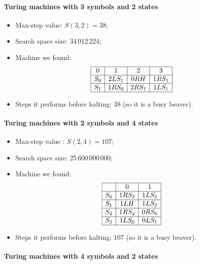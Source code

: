 \documentclass{report}
\begin{document}
\paragraph{Turing machines with 3 symbols and 2 states}

\begin{itemize}
\item Max-step value: $S(3,2) = 38$;
\item Search space size: 34\,012\,224;
\item Machine we found:
\[
\begin{array}[h]{|c|c|c|c|c|}
\hline
0&   1&   2& 3\\
\hline
S_0& 2LS_1& 0RH& 1RS_1\\
\hline
S_1& 1RS_0& 2RS_1& 1LS_1\\
\hline
\end{array}
\]
\item Steps it performs before halting: 38 (so it is a busy beaver).
\end{itemize}


\paragraph{Turing machines with 2 symbols and 4 states}


\begin{itemize}
\item Max-step value \cite{allen}: $S(2,4) = 107$;
\item Search space size: 25\,600\,000\,000;
\item Machine we found:
\[
\begin{array}[h]{|c|c|c|c|}
  \hline
  &0&   1\\
  \hline
  S_0& 1RS_3& 1LS_3\\
  \hline
  S_1& 1LH& 1LS_2\\
  \hline
  S_2& 1RS_2& 0RS_0\\
  \hline
  S_3& 1LS_0& 0LS_1\\
\hline
\end{array}
\]
\item Steps it performs before halting: 107 (so it is a busy beaver).
\end{itemize}

\paragraph{Turing machines with 4 symbols and 2 states}
\end{document}
